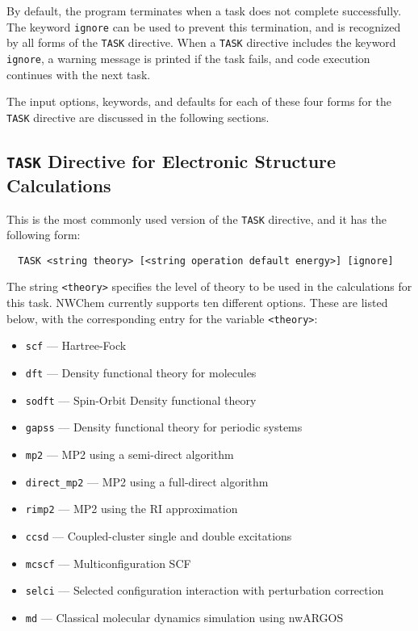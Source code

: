 By default, the program terminates when a task does not complete
successfully.  The keyword \verb+ignore+ can be used to prevent this
termination, and is recognized by all forms of the \verb+TASK+
directive.  When a \verb+TASK+ directive includes the keyword
\verb+ignore+, a warning message is printed if the task fails, and
code execution continues with the next task.

The input options, keywords, and defaults for each of these four forms
for the \verb+TASK+ directive are discussed in the following sections.

\subsection{{\tt TASK} Directive for Electronic Structure Calculations}
\label{sec:first_task}

This is the most commonly used version of the \verb+TASK+ directive, and
it has the following form:

\begin{verbatim}
  TASK <string theory> [<string operation default energy>] [ignore]
\end{verbatim}

The string \verb+<theory>+ specifies the level of theory to be used in the
calculations for this task.  NWChem currently supports ten different
options.  These are listed below, with the corresponding entry for 
the variable {\tt <theory>}:
\begin{itemize}
 \item \verb+scf+ --- Hartree-Fock
 \item \verb+dft+ --- Density functional theory for molecules
 \item \verb+sodft+ --- Spin-Orbit Density functional theory
 \item \verb+gapss+ --- Density functional theory for periodic systems
 \item \verb+mp2+ --- MP2 using a semi-direct algorithm
 \item \verb+direct_mp2+ --- MP2 using a full-direct algorithm
 \item \verb+rimp2+ --- MP2 using the RI approximation
 \item \verb+ccsd+ --- Coupled-cluster single and double excitations
 \item \verb+mcscf+ --- Multiconfiguration SCF
 \item \verb+selci+ --- Selected configuration interaction with perturbation
   correction 
 \item \verb+md+ --- Classical molecular dynamics simulation using nwARGOS
\end{itemize}

